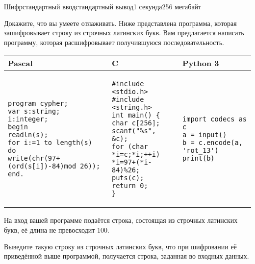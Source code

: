 \begin{problem}{Шифр}{стандартный ввод}{стандартный вывод}{1 секунда}{256 мегабайт}

Докажите, что вы умеете отлаживать. Ниже представлена программа, которая зашифровывает строку из строчных латинских букв. Вам предлагается написать программу, которая расшифровывает получившуюся последовательность.


\bigskip

\noindent\begin{tabular}{|p{}|p{}|p{}|}
\hline
\textbf{Pascal} & \textbf{C} & \textbf{Python 3} \\
\hline
\begin{lstlisting}
program cypher;
var s:string;
i:integer;
begin
readln(s);
for i:=1 to length(s) do
write(chr(97+(ord(s[i])-84)mod 26));
end.
\end{lstlisting}&

\begin{lstlisting}
#include <stdio.h>
#include <string.h>
int main() {
char c[256];
scanf("%s", &c);
for (char *i=c;*i;++i)
*i=97+(*i-84)%26;
puts(c);
return 0;
}
\end{lstlisting}&

\begin{lstlisting}
import codecs as c
a = input()
b = c.encode(a, 'rot_13')
print(b)
\end{lstlisting} \\
\hline
\end{tabular}


\InputFile
На вход вашей программе подаётся строка, состоящая из строчных латинских букв, её длина не превосходит 100.

\OutputFile
Выведите такую строку из строчных латинских букв, что при шифровании её приведённой выше программой, получается строка, заданная во входных данных.

\Examples

\begin{example}
%
%
\end{example}

\end{problem}

